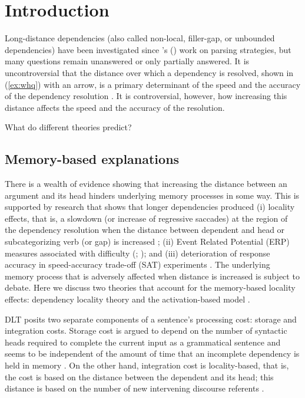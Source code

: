 \documentclass{frontiersSCNS}\usepackage{knitr}
\newcommand{\posscitet}[1]{\citeauthor{#1}'s (\citeyear{#1})}
\begin{document}
\section{Introduction}

Long-distance dependencies (also called non-local, filler-gap, or unbounded dependencies) have been investigated since \posscitet{Fodor1978}  work on parsing strategies, but many questions remain unanswered or only partially answered. It is uncontroversial that the distance over which a dependency is resolved, shown in (\ref{ex:whq}) with an arrow,  is a primary determinant of the speed and the accuracy of the dependency resolution \citep[among others:][]{Gibson2000,McElreeEtAl2003,LewisVasishth2005,Levy2008}.  It is controversial, however, how increasing this distance affects the speed and the accuracy of the resolution. 
\begin{exe} 
\ex  \linkfrom What \under do different theories \to predict? \label{ex:whq}
\end{exe}


\subsection{Memory-based explanations} 

There is a wealth of evidence showing that increasing the distance between an argument and its head hinders underlying memory processes in some way. This is supported by research that shows that longer dependencies produced (i) locality effects, that is, a slowdown (or increase of regressive saccades) at the region of the dependency resolution when the distance between dependent and head or subcategorizing verb (or gap) is increased \citep[either in self-paced reading, eye-tracking experiments, or both; among others:][]{Gibson2000,GrodnerGibson2005,DembergKeller2008,BartekEtAl2011,VasishthDrenhaus2011}; (ii) Event Related Potential (ERP) measures associated with difficulty (\citealp{KluenderKutas1993,FiebachEtAl2002}; \citealp[but see:][]{PhillipsEtAl2005}); and (iii) deterioration of response accuracy in speed-accuracy trade-off (SAT) experiments \citep{McElree2000,McElreeEtAl2003}. The underlying memory process that is adversely affected when distance is increased is subject to debate. Here we discuss two theories that account for the memory-based locality effects: dependency locality theory  \citep[DLT;][]{Gibson2000} and the activation-based model  \citep{LewisVasishth2005}.

DLT posits two separate components of a sentence's  processing cost:  storage and integration costs. Storage cost is argued to depend on the number of syntactic heads required to complete the current input as a grammatical sentence \citep{Gibson2000} and seems to be independent of the amount of time that an incomplete dependency is held in memory \citep{GibsonEtAl2005}. On the other hand, integration cost is locality-based, that is, the cost is based on the distance between the dependent and its head; this distance is based on the number of new intervening discourse referents \citep{Gibson2000}.
\end{document}
